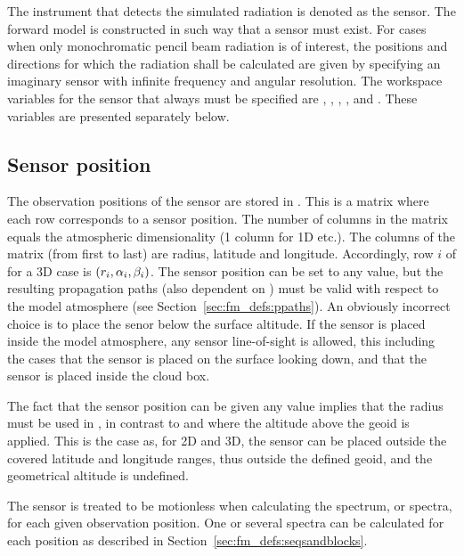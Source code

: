 The instrument that detects the simulated radiation is denoted as the
sensor. The forward model is constructed in such
way that a sensor must exist. For cases when only monochromatic pencil
beam radiation is of interest, the positions and directions for which
the radiation shall be calculated are given by specifying an imaginary
sensor with infinite frequency and angular resolution. The workspace
variables for the sensor that always must be specified are
, ,
, ,
 and . These
variables are presented separately
below. 


\subsection{Sensor position}
\label{sec:fm_defs:sensorpos}

The observation positions of the sensor are stored in
. This is a matrix where each row corresponds to
a sensor position. The number of columns in the matrix equals the
atmospheric dimensionality (1 column for 1D etc.). The columns of the
matrix (from first to last) are radius, latitude and longitude.
Accordingly, row $i$ of  for a 3D case is
$(r_{i},\alpha_{i},\beta_{i})$. The sensor position can be set to any
value, but the resulting propagation paths (also dependent on
) must be valid with respect to the model
atmosphere (see Section~\ref{sec:fm_defs:ppaths}). An obviously
incorrect choice is to place the senor below the surface altitude. If
the sensor is placed inside the model atmosphere, any sensor
line-of-sight is allowed, this including the cases that the sensor is
placed on the surface looking down, and that the sensor is placed
inside the cloud box.

The fact that the sensor position can be given any value implies that
the radius must be used in , in contrast to
 and  where the altitude
above the geoid is applied. This is the case as, for 2D and 3D, the
sensor can be placed outside the covered latitude and longitude
ranges, thus outside the defined geoid, and the geometrical altitude is
undefined. 

The sensor is treated to be motionless when calculating the spectrum,
or spectra, for each given observation position. One or several
spectra can be calculated for each position as described in
Section~\ref{sec:fm_defs:seqsandblocks}.


